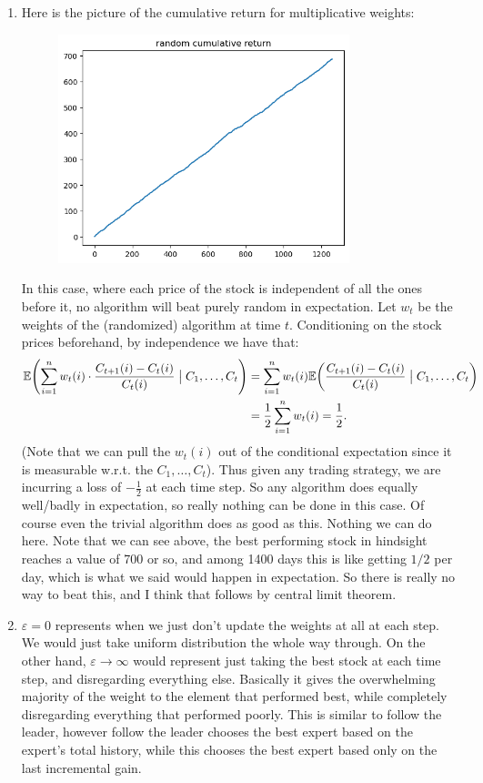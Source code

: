 \documentclass[12pt]{article}
\def\ve{\varepsilon}
\newcommand{\E}{\mathbb{E}\qty}
\begin{document}
\begin{enumerate}[label=(\alph*)]
        \item Here is the picture of the cumulative return for multiplicative weights:
        \begin{figure}[H]
            \centering
            \includegraphics[width=0.8\textwidth]{random_cum_return.png}
        \end{figure}
        In this case, where each price of the stock is independent of all the ones before it, no algorithm will beat purely random in expectation. Let $w_t$ be the weights of the (randomized) algorithm at time $t$. Conditioning on the stock prices beforehand, by independence we have that:
        \begin{align*}
            \E(\sum_{i=1}^n w_t(i) \cdot \frac{C_{t+1}(i) - C_t(i)}{C_t(i)} \bigm| C_1, \ldots, C_t) &= \sum_{i=1}^n w_t(i) \E(\frac{C_{t+1}(i) - C_t(i)}{C_t(i)} \bigm| C_1, \ldots, C_t) 
        \\&= \frac 12 \sum_{i=1}^n w_t(i) = \frac 12.
        \end{align*}
        (Note that we can pull the $w_t(i)$ out of the conditional expectation since it is measurable w.r.t. the $C_1, \ldots, C_t$). Thus given any trading strategy, we are incurring a loss of $-\frac12$ at each time step. So any algorithm does equally well/badly in expectation, so really nothing can be done in this case. Of course even the trivial algorithm does as good as this. Nothing we can do here. Note that we can see above, the best performing stock in hindsight reaches a value of 700 or so, and among 1400 days this is like getting $1/2$ per day, which is what we said would happen in expectation. So there is really no way to beat this, and I think that follows by central limit theorem.

        \item $\ve = 0$ represents when we just don't update the weights at all at each step. We would just take uniform distribution the whole way through. On the other hand, $\varepsilon \to \infty$ would represent just taking the best stock at each time step, and disregarding everything else. Basically it gives the overwhelming majority of the weight to the element that performed best, while completely disregarding everything that performed poorly. This is similar to follow the leader, however follow the leader chooses the best expert based on the expert's total history, while this chooses the best expert based only on the last incremental gain.
    \end{enumerate}
\end{document}
